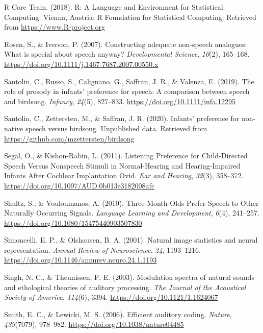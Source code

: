 \documentclass[
  man]{apa6}
\begin{document}
\leavevmode\hypertarget{ref-r_core_team_r:_2018}{}%
R Core Team. (2018). R: A Language and Environment for Statistical Computing. Vienna, Austria: R Foundation for Statistical Computing. Retrieved from \url{https://www.R-project.org}

\leavevmode\hypertarget{ref-rosen_constructing_2007}{}%
Rosen, S., \& Iverson, P. (2007). Constructing adequate non-speech analogues: What is special about speech anyway? \emph{Developmental Science}, \emph{10}(2), 165--168. \url{https://doi.org/10.1111/j.1467-7687.2007.00550.x}

\leavevmode\hypertarget{ref-santolin_role_2019}{}%
Santolin, C., Russo, S., Calignano, G., Saffran, J. R., \& Valenza, E. (2019). The role of prosody in infants' preference for speech: A comparison between speech and birdsong. \emph{Infancy}, \emph{24}(5), 827--833. \url{https://doi.org/10.1111/infa.12295}

\leavevmode\hypertarget{ref-santolin_infants_2020}{}%
Santolin, C., Zettersten, M., \& Saffran, J. R. (2020). Infants' preference for non-native speech versus birdsong. Unpublished data. Retrieved from \url{https://github.com/mzettersten/birdsong}

\leavevmode\hypertarget{ref-segal_listening_2011}{}%
Segal, O., \& Kishon-Rabin, L. (2011). Listening Preference for Child-Directed Speech Versus Nonspeech Stimuli in Normal-Hearing and Hearing-Impaired Infants After Cochlear Implantation Ovid. \emph{Ear and Hearing}, \emph{32}(3), 358--372. \url{https://doi.org/10.1097/AUD.0b013e3182008afc}

\leavevmode\hypertarget{ref-shultz_three-month-olds_2010}{}%
Shultz, S., \& Vouloumanos, A. (2010). Three-Month-Olds Prefer Speech to Other Naturally Occurring Signals. \emph{Language Learning and Development}, \emph{6}(4), 241--257. \url{https://doi.org/10.1080/15475440903507830}

\leavevmode\hypertarget{ref-simoncelli_natural_2001}{}%
Simoncelli, E. P., \& Olshausen, B. A. (2001). Natural image statistics and neural representation. \emph{Annual Review of Neuroscience}, \emph{24}, 1193--1216. \url{https://doi.org/10.1146/annurev.neuro.24.1.1193}

\leavevmode\hypertarget{ref-singh_modulation_2003}{}%
Singh, N. C., \& Theunissen, F. E. (2003). Modulation spectra of natural sounds and ethological theories of auditory processing. \emph{The Journal of the Acoustical Society of America}, \emph{114}(6), 3394. \url{https://doi.org/10.1121/1.1624067}

\leavevmode\hypertarget{ref-smith_efficient_2006}{}%
Smith, E. C., \& Lewicki, M. S. (2006). Efficient auditory coding. \emph{Nature}, \emph{439}(7079), 978--982. \url{https://doi.org/10.1038/nature04485}
\end{document}
